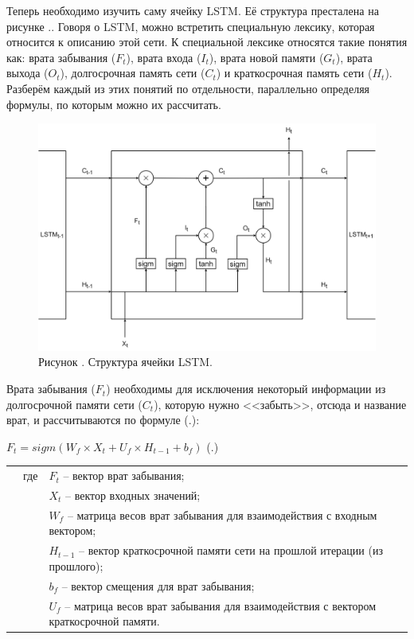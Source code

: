 {  \par \redline Теперь необходимо изучить саму ячейку LSTM. Её структура престалена на рисунке \thechaptercntr .\theimagecntr. Говоря о LSTM, можно встретить специальную лексику, которая относится к описанию этой сети. К специальной лексике относятся такие понятия как: врата забывания ($F_t$), врата входа ($I_t$), врата новой памяти ($G_t$), врата выхода ($O_t$), долгосрочная память сети ($C_t$) и краткосрочная память сети ($H_t$). Разберём каждый из этих понятий по отдельности, параллельно определяя формулы, по которым можно их рассчитать.

  \begin{figure}
    \centering
    \def\svgwidth{\textwidth}
    \includegraphics[scale=0.225]{../GMs/Pl3/LSTM.png}
    \caption*{\gostFont Рисунок \thechaptercntr .\theimagecntr \spc {--} Структура ячейки LSTM.}
    \label{fig:LSTM}
  \end{figure} \addtocounter{imagecntr}{1}

  \par \redline Врата забывания ($F_t$) необходимы для исключения некоторый информации из долгосрочной памяти сети ($C_t$), которую нужно <<забыть>>, отсюда и название врат, и рассчитываются по формуле (\thechaptercntr .\theformulacntr):

  \formulaspace \par \redline 
    $F_t = sigm(W_f \times X_t + U_f \times H_{t-1} + b_f)$
    \hfill (\thechaptercntr .\theformulacntr) \redline
  \formulaspace \addtocounter{formulacntr}{1}

  \begin{tabular}{p{}p{}p{}}
		& где  & $F_t$ {--} вектор врат забывания; \\
    & 	   & $X_t$ {--} вектор входных значений; \\
		& 	   & $W_f$ {--} матрица весов врат забывания для взаимодействия с входным вектором; \\
    & 	   & $H_{t-1}$ {--} вектор краткосрочной памяти сети на прошлой итерации (из прошлого); \\
    & 	   & $b_f$ {--} вектор смещения для врат забывания; \\
    & 	   & $U_f$ {--} матрица весов врат забывания для взаимодействия с вектором краткосрочной памяти. \\
  \end{tabular}

}
